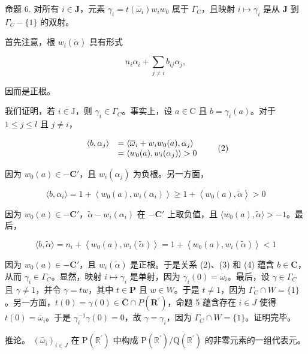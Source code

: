 命题 6. 对所有 \(i \in \mathbf{J}\)，元素 \(\gamma_i = t(\overline{\omega}_i)w_i w_0\) 属于 \(\Gamma_{C}\)，且映射 \(i \mapsto \gamma_i\) 是从 \(\mathbf{J}\) 到 \(\Gamma_{C} - \{1\}\) 的双射。

首先注意，根 \(w_{i}(\tilde{\alpha})\) 具有形式

\[
n _ {i} \alpha_ {i} + \sum_ {j \neq i} b _ {i j} \alpha_ {j},
\]

因而是正根。

我们证明，若 \(i \in \mathrm{J}\)，则 \(\gamma_i \in \Gamma_{C}\)。事实上，设 \(a \in \mathrm{C}\) 且 \(b = \gamma_i(a)\)。对于 \(1 \leqslant j \leqslant l\) 且 \(j \neq i\)，

\[
\begin{array}{r l} \langle b, \alpha_ {j} \rangle & = \langle \overline {{\omega}} _ {i} + w _ {i} w _ {0} (a), \alpha_ {j} \rangle \\ & = \langle w _ {0} (a), w _ {i} (\alpha_ {j}) \rangle > 0 \end{array}\tag{2}
\]

因为 \(w_0(a) \in -\mathbf{C}'\)，且 \(w_i(\alpha_j)\) 为负根。另一方面，

\[
\langle b, \alpha_ {i} \rangle = 1 + \left\langle w _ {0} (a), w _ {i} (\alpha_ {i}) \right\rangle \geqslant 1 + \left\langle w _ {0} (a), \tilde {\alpha} \right\rangle > 0\tag{3}
\]

因为 \(w_0(a) \in -\mathbf{C}'\)，\(\tilde{\alpha} - w_i(\alpha_i)\) 在 \(-\mathbf{C}'\) 上取负值，且 \(\langle w_0(a), \tilde{\alpha} \rangle > -1\)。最后，

\[
\langle b, \tilde {\alpha} \rangle = n _ {i} + \left\langle w _ {0} (a), w _ {i} (\tilde {\alpha}) \right\rangle = 1 + \left\langle w _ {0} (a), w _ {i} (\tilde {\alpha}) \right\rangle <   1\tag{4}
\]

因为 \(w_0(a) \in -\mathbf{C}'\)，且 \(w_i(\tilde{\alpha})\) 是正根。于是关系 (2)、(3) 和 (4) 蕴含 \(b \in \mathbf{C}\)，从而 \(\gamma_i \in \Gamma_{C}\)。显然，映射 \(i \mapsto \gamma_i\) 是单射，因为 \(\gamma_i(0) = \overline{\omega}_i\)。最后，设 \(\gamma \in \Gamma_{C}\) 且 \(\gamma \neq 1\)，并令 \(\gamma = tw\)，其中 \(t \in \mathbf{P}\) 且 \(w \in W\)。于是 \(t \neq 1\)，因为 \(\Gamma_{C} \cap W = \{1\}\)。另一方面，\(t(0) = \gamma(0) \in \overline{\mathbf{C}} \cap P(\mathbf{R}^{\prime})\)，命题 5 蕴含存在 \(i \in J\) 使得 \(t(0) = \overline{\omega}_i\)。于是 \(\gamma_i^{-1}\gamma(0) = 0\)，故 \(\gamma = \gamma_i\)，因为 \(\Gamma_{C} \cap W = \{1\}\)。证明完毕。

推论。 \((\bar{\omega}_i)_{i\in J}\) 在 \(\mathrm{P}(\mathbb{R}^{\prime})\) 中构成 \(\mathrm{P}(\mathbb{R}^{\prime}) / \mathrm{Q}(\mathbb{R}^{\prime})\) 的非零元素的一组代表元。

